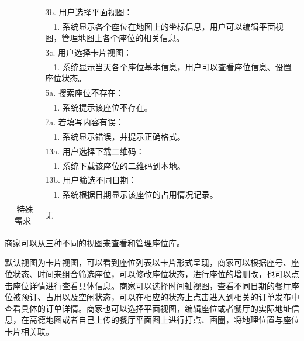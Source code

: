 \begin{table}[htbp!]
\begin{tabular}{cp{11.5cm}}
    & 3b. 用户选择平面视图：\\
    & ~~1.	系统显示各个座位在地图上的坐标信息，用户可以编辑平面视图，管理地图上各个座位的相关信息。\\
    & 3c. 用户选择卡片视图：\\
    & ~~1.	系统显示当天各个座位基本信息，用户可以查看座位信息、设置座位状态。\\
    & 5a. 搜索座位不存在：\\
    & ~~1.	系统提示该座位不存在。\\
    & 7a. 若填写内容有误：\\
    & ~~1.	系统显示错误，并提示正确格式。\\
    & 13a. 用户选择下载二维码：\\
    & ~~1.	系统下载该座位的二维码到本地。\\
    & 13b. 用户筛选不同日期：\\
    & ~~1.	系统根据日期显示该座位的占用情况记录。\\
  \hline
  \ 特殊需求 & 无 \\ 
  \hline
  \end{tabular}
  \label{table:uc7}
\end{table}

商家可以从三种不同的视图来查看和管理座位库。

默认视图为卡片视图，可以看到座位列表以卡片形式呈现，商家可以根据座号、座位状态、时间来组合筛选座位，可以修改座位状态，进行座位的增删改，也可以点击座位详情进行查看具体信息。商家可以选择时间轴视图，查看不同日期的餐厅座位被预订、占用以及空闲状态，可以在相应的状态上点击进入到相关的订单发布中查看具体的订单详情。商家也可以选择平面视图，编辑座位或者餐厅的实际地址信息，在高德地图或者自己上传的餐厅平面图上进行打点、画圈，将地理位置与座位卡片相关联。

